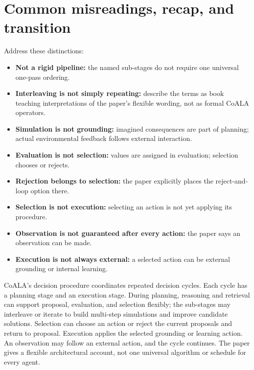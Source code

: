 \section{Common misreadings, recap, and transition}
Address these distinctions:
\begin{itemize}
  \item \textbf{Not a rigid pipeline:} the named sub-stages do not require one universal one-pass ordering.
  \item \textbf{Interleaving is not simply repeating:} describe the terms as book teaching interpretations of the paper's flexible wording, not as formal CoALA operators.
  \item \textbf{Simulation is not grounding:} imagined consequences are part of planning; actual environmental feedback follows external interaction.
  \item \textbf{Evaluation is not selection:} values are assigned in evaluation; selection chooses or rejects.
  \item \textbf{Rejection belongs to selection:} the paper explicitly places the reject-and-loop option there.
  \item \textbf{Selection is not execution:} selecting an action is not yet applying its procedure.
  \item \textbf{Observation is not guaranteed after every action:} the paper says an observation can be made.
  \item \textbf{Execution is not always external:} a selected action can be external grounding or internal learning.
\end{itemize}

\begin{chapterrecap}
CoALA's decision procedure coordinates repeated decision cycles. Each cycle has a planning stage and an execution stage. During planning, reasoning and retrieval can support proposal, evaluation, and selection flexibly; the sub-stages may interleave or iterate to build multi-step simulations and improve candidate solutions. Selection can choose an action or reject the current proposals and return to proposal. Execution applies the selected grounding or learning action. An observation may follow an external action, and the cycle continues. The paper gives a flexible architectural account, not one universal algorithm or schedule for every agent.
\end{chapterrecap}


